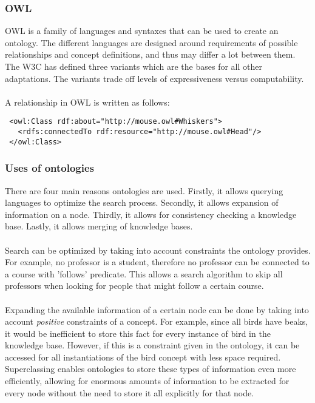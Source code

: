 \documentclass{article}
\begin{document}
 
 \subsubsection{OWL}
 OWL is a family of languages and syntaxes that can be used to create an ontology. The different languages are designed around requirements of possible relationships and concept definitions, and thus may differ a lot between them. The W3C has defined three variants which are the bases for all other adaptations. The variants trade off levels of expressiveness versus computability.
 \paragraph{}
 A relationship in OWL is written as follows:
 
 \lstset{language=XML}
 \begin{lstlisting}
 <owl:Class rdf:about="http://mouse.owl#Whiskers">
   <rdfs:connectedTo rdf:resource="http://mouse.owl#Head"/>
 </owl:Class>
 \end{lstlisting}
 
 \subsubsection{Uses of ontologies}
 There are four main reasons ontologies are used. Firstly, it allows querying languages to optimize the search process. Secondly, it allows expansion of information on a node. Thirdly, it allows for consistency checking a knowledge base. Lastly, it allows merging of knowledge bases.
 \paragraph{}
 Search can be optimized by taking into account constraints the ontology provides. For example, no professor is a student, therefore no professor can be connected to a course with 'follows' predicate. This allows a search algorithm to skip all professors when looking for people that might follow a certain course.
 \paragraph{}
 Expanding the available information of a certain node can be done by taking into account \textit{positive} constraints of a concept. For example, since all birds have beaks, it would be inefficient to store this fact for every instance of bird in the knowledge base. However, if this is a constraint given in the ontology, it can be accessed for all instantiations of the bird concept with less space required. Superclassing enables ontologies to store these types of information even more efficiently, allowing for enormous amounts of information to be extracted for every node without the need to store it all explicitly for that node.
\end{document}
